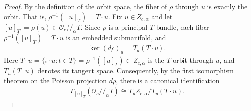 \documentclass[11pt,reqno]{amsart}
\newtheorem*{theorem A}{Main Theorem A}
\newtheorem*{theorem B}{Main Theorem B}
\newtheorem*{theorem C}{Main Theorem C}
\newtheorem*{theorem D}{Main Theorem D}
\theoremstyle{definition}
\theoremstyle{plain}
\theoremstyle{conclusion}
\begin{document}
\begin{proof}
By the definition of the orbit space, the fiber of $\rho$ through $u$ is exactly the orbit. That is, $\rho^{-1}([u]_T) = T\cdot u$.  Fix $u\in Z_{c,\alpha}$ and let $[u]_T:=\rho(u)\in \mathcal{O}_c//_\alpha T$. Since $\rho$ is a principal $T$-bundle, each fiber $\rho^{-1}([u]_T) = T\cdot u$ is an embedded submanifold, and   \begin{align*}
    \ker(d\rho)_u = T_u(T\cdot u).
\end{align*} Here $T \cdot u = \{t \cdot u:  t \in T\} = \rho^{-1}([u]_T) \subset Z_{c,\alpha}$ is the $T$-orbit through $u$, and $T_u(T\cdot u)$ denotes its tangent space. Consequently, by the first isomorphism theorem on the Poisson projection $d\rho$, there is a canonical identification \begin{align}
T_{[u]_T}(\mathcal{O}_c//_\alpha T) \cong  T_uZ_{c,\alpha}\big/ T_u(T\cdot u). \label{eq:tangentquo}
\end{align}


\end{proof}
\end{document}
